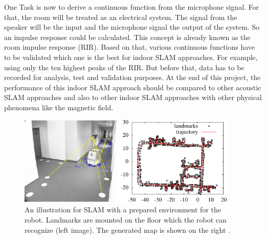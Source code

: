 One Task is now to derive a continuous function from the microphone signal. For that, the room will be treated as an electrical system. The signal from the speaker will be the input and the microphone signal the output of the system. So an impulse response could be calculated. This concept is already known as the room impulse response (RIR). Based on that, various continuous functions have to be validated which one is the best for indoor SLAM approaches. For example, using only the ten highest peaks of the RIR. But before that, data has to be recorded for analysis, test and validation purposes. At the end of this project, the performance of this indoor SLAM approach should be compared to other acoustic SLAM approaches and also to other indoor SLAM approaches with other physical phenomena like the magnetic field.

\begin{figure}[h!]
	\centering
	\captionsetup{justification=centering,margin=0.5cm}
	\includegraphics[width=0.935\textwidth]{images/grisetti_slam_example.png}
	\caption{
		An illustration for SLAM with a prepared environment for the robot. Landmarks are mounted on the floor which the robot can recognize (left image). The generated map is shown on the right \cite{grisetti_tutorial_2010}.
	}
	\label{fig:grisetti_slam_example}
\end{figure}